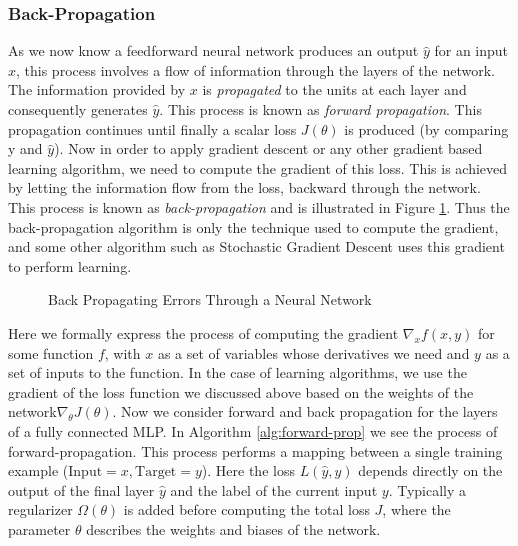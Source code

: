 \documentclass[14pt]{extarticle}
\numberwithin{equation}{section}
\begin{document}
	\subsubsection{Back-Propagation}	
	As we now know a feedforward neural network produces an output $\hat{y}$ for an input $x$, this process involves a flow of information through the layers of the network. The information provided by $x$ is \textit{propagated} to the units at each layer and consequently generates $\hat{y}$. This process is known as \textit{forward propagation}. This propagation continues until finally a scalar loss $J(\theta)$ is produced (by comparing y and $ \hat{y}$). Now in order to apply gradient descent or any other gradient based learning algorithm, we need to compute the gradient of this loss. This is achieved by letting the information flow from the loss, backward through the network. This process is known as \textit{back-propagation}\cite{rumelhart1986learning} and is illustrated in Figure \ref{back_prop}. Thus the back-propagation algorithm is only the technique used to compute the gradient, and some other algorithm such as Stochastic Gradient Descent uses this gradient to perform learning. 
	\begin{figure}[H]
		\centering
		\setlength{\fboxsep}{5pt}%
		\setlength{\fboxrule}{1pt}%
		\caption{Back Propagating Errors Through a Neural Network
			\label{back_prop}}
	\end{figure}
	Here we formally express the process of computing the gradient $\nabla_{x}f(x,y)$ for some function $f$, with $x$ as a set of variables whose derivatives we need and $y$ as a set of inputs to the function. In the case of learning algorithms, we use the gradient of the loss function we discussed above based on the weights of the network$\nabla_{\theta}J(\theta)$.
	Now we consider forward and back propagation for the layers of a fully connected MLP. In Algorithm \ref{alg:forward-prop} we see the process of forward-propagation. This process performs a mapping between a single training example ($\text{Input}=x, \text{Target}=y$). Here the loss $L(\hat{y},y)$ depends directly on the output of the final layer $\hat{y}$ and the label of the current input $y$. Typically a regularizer $\Omega(\theta)$ is added before computing the total loss $J$, where the parameter $\theta$ describes the weights and biases of the network.
\end{document}
